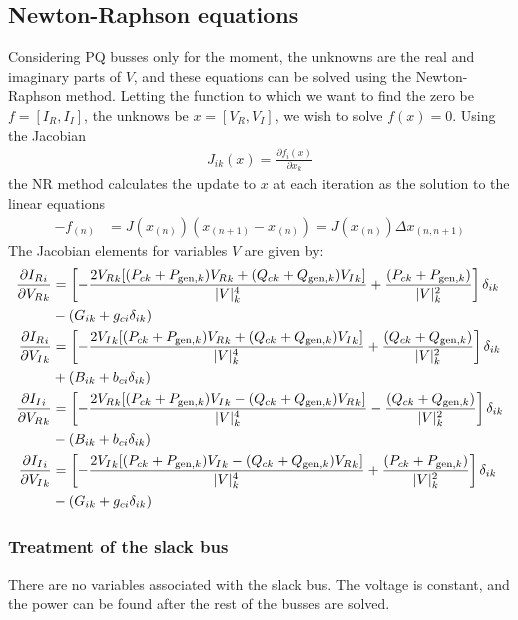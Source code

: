 \documentclass[11pt]{article}
\newcommand{\Vr}{{V_R}}
\newcommand{\Vi}{{V_I}}
\newcommand{\Ir}{{I_R}}
\newcommand{\Ii}{{I_I}}
\begin{document}
\subsection{Newton-Raphson equations}
Considering PQ busses only for the moment, the unknowns are the real and imaginary parts of $V$, and these equations can be solved using the Newton-Raphson method. Letting the function to which we want to find the zero be $f = [\Ir, \Ii]$, the unknows be $x = [\Vr, \Vi]$, we wish to solve $f(x) = 0$. Using the Jacobian
\begin{align}
J_{ik}(x) = \frac{\partial f_i(x)}{\partial x_k}
\end{align}
the NR method calculates the update to $x$ at each iteration as the solution to the linear equations
\begin{align}
-f_{(n)} &= J(x_{(n)})(x_{(n+1)}-x_{(n)}) = J(x_{(n)})\Delta x_{(n,n+1)}
\label{EQ_NR}
\end{align}
The Jacobian elements for variables $V$ are given by:
\begin{align}
	\frac{\partial \Ir_i}{\partial \Vr_{k}} 
		&= \left[-\frac{2\Vr_k[(P_{ck} + P_{\text{gen},k})\Vr_k + (Q_{ck} + Q_{\text{gen},k})\Vi_k]}{|V|_k^4} + \frac{(P_{ck} + P_{\text{gen},k})}{|V|_k^2} \right]\delta_{ik} \notag \\
		&- (G_{ik} + g_{ci}\delta_{ik}) \\
	\frac{\partial \Ir_i}{\partial \Vi_{k}} 
		&= \left[-\frac{2\Vi_k[(P_{ck} + P_{\text{gen},k})\Vr_k + (Q_{ck} + Q_{\text{gen},k})\Vi_k]}{|V|_k^4} + \frac{(Q_{ck} + Q_{\text{gen},k})}{|V|_k^2} \right]\delta_{ik} \notag \\
		&+ (B_{ik} + b_{ci}\delta_{ik}) \\
	\frac{\partial \Ii_i}{\partial \Vr_{k}}
		&= \left[-\frac{2\Vr_k[(P_{ck} + P_{\text{gen},k})\Vi_k - (Q_{ck} + Q_{\text{gen},k})\Vr_k]}{|V|_k^4} - \frac{(Q_{ck} + Q_{\text{gen},k})}{|V|_k^2} \right]\delta_{ik} \notag \\
		&- (B_{ik} + b_{ci}\delta_{ik}) \\
	\frac{\partial \Ii_i}{\partial \Vi_{k}}
		&= \left[-\frac{2\Vi_k[(P_{ck} + P_{\text{gen},k})\Vi_k - (Q_{ck} + Q_{\text{gen},k})\Vr_k]}{|V|_k^4} + \frac{(P_{ck} + P_{\text{gen},k})}{|V|_k^2} \right] \delta_{ik} \notag \\
		&- (G_{ik} + g_{ci}\delta_{ik}) \\
\end{align}

\subsubsection{Treatment of the slack bus}
There are no variables associated with the slack bus. The voltage is constant, and the power can be found after the rest of the busses are solved.
\end{document}
